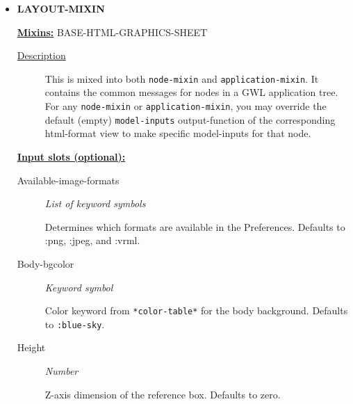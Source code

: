 \documentclass [11pt]{book}
\begin{document}
\begin{itemize}
\begin{description}
\end{description}









\item {}
\textbf{LAYOUT-MIXIN}


\textbf{
\underline{Mixins:}} BASE-HTML-GRAPHICS-SHEET





\begin{description}

\item [
\underline{Description}]


This is mixed into both \texttt{node-mixin} and \texttt{application-mixin}. It contains the common
messages for nodes in a GWL application tree. For any \texttt{node-mixin} or \texttt{application-mixin}, you may override the default (empty)
\texttt{model-inputs} output-function of the corresponding html-format view to make specific model-inputs for that node.



\end{description}








\textbf{
\underline{Input slots (optional):}}

\begin{description}

\item [Available-image-formats]
\emph{List of keyword symbols}

 Determines which formats are available in the Preferences. Defaults to :png, :jpeg, and :vrml.




\item [Body-bgcolor]
\emph{Keyword symbol}

 Color keyword from \texttt{*color-table*} for the body background. Defaults to \texttt{:blue-sky}.




\item [Height]
\emph{Number}

 Z-axis dimension of the reference box. Defaults to zero.





\end{description}
\end{itemize}
\end{document}
